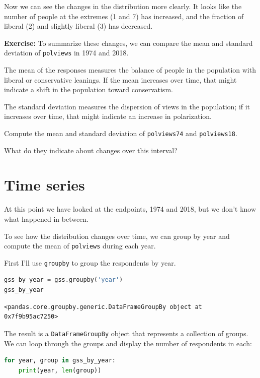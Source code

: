 Now we can see the changes in the distribution more clearly. It looks
like the number of people at the extremes (1 and 7) has increased, and
the fraction of liberal (2) and slightly liberal (3) has decreased.

\textbf{Exercise:} To summarize these changes, we can compare the mean
and standard deviation of \passthrough{\lstinline!polviews!} in 1974 and
2018.

The mean of the responses measures the balance of people in the
population with liberal or conservative leanings. If the mean increases
over time, that might indicate a shift in the population toward
conservatism.

The standard deviation measures the dispersion of views in the
population; if it increases over time, that might indicate an increase
in polarization.

Compute the mean and standard deviation of
\passthrough{\lstinline!polviews74!} and
\passthrough{\lstinline!polviews18!}.

What do they indicate about changes over this interval?

\hypertarget{time-series}{%
\section{Time series}\label{time-series}}

At this point we have looked at the endpoints, 1974 and 2018, but we
don't know what happened in between.

To see how the distribution changes over time, we can group by year and
compute the mean of \passthrough{\lstinline!polviews!} during each year.

First I'll use \passthrough{\lstinline!groupby!} to group the
respondents by year.

\begin{lstlisting}[language=Python]
gss_by_year = gss.groupby('year')
gss_by_year
\end{lstlisting}

\begin{lstlisting}[]
<pandas.core.groupby.generic.DataFrameGroupBy object at 0x7f9b95ac7250>
\end{lstlisting}

The result is a \passthrough{\lstinline!DataFrameGroupBy!} object that
represents a collection of groups. We can loop through the groups and
display the number of respondents in each:

\begin{lstlisting}[language=Python]
for year, group in gss_by_year:
    print(year, len(group))
\end{lstlisting}

